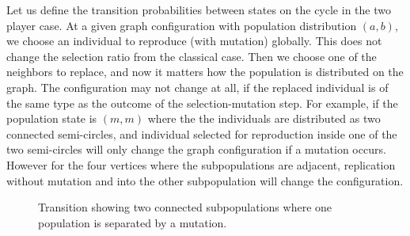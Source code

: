 \documentclass[aps,prd,11pt,notitlepage,nofootinbib,superscriptaddress,showkeys,letterpaper]{revtex4-1}
\begin{document}
Let us define the transition probabilities between states on the cycle
in the two player case. At a given graph configuration with
population distribution $(a, b)$, we choose an individual to reproduce (with
mutation) globally. This does not change the selection ratio from the classical
case. Then we choose one of the neighbors to replace, and now it matters how
the population is distributed on the graph. The configuration may not change at
all, if the
replaced individual is of the same type as the outcome of the selection-mutation
step. For example, if the population state is $(m, m)$ where the the individuals
are distributed as two connected semi-circles, and individual selected for
reproduction inside one of the two semi-circles will only change the graph
configuration if a mutation occurs. However for the four vertices where the
subpopulations are adjacent, replication without mutation and into the other
subpopulation will change the configuration.

\begin{figure}
\centering

\caption{Transition showing two connected subpopulations where one population
is separated by a mutation.}
\label{transition_1}
\end{figure}
\end{document}
